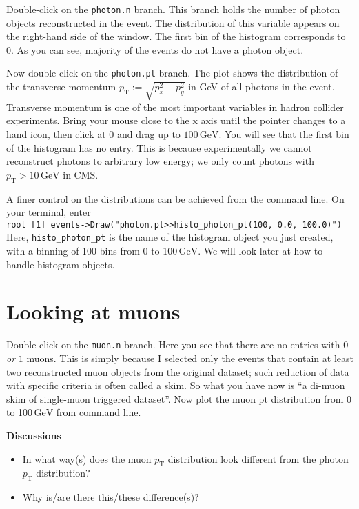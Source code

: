 \documentclass[12pt]{article}
\newcommand{\rterminal}[2]{\vspace{3pt}\texttt{root [#1] #2} \\}
\newcommand{\GeV}{\ensuremath{\,\mathrm{GeV}}\xspace}
\newcommand{\pt}{\ensuremath{p_{\mathrm{T}}}\xspace}
\newenvironment{discussions}{%
\vspace{0.2in}%
\textbf{Discussions}%
\begin{itemize}%
}{%
\end{itemize}%
}
\begin{document}
Double-click on the \texttt{photon.n} branch. This branch holds the number of photon objects reconstructed in the event. The distribution of this variable appears on the right-hand side of the window. The first bin of the histogram corresponds to $0$. As you can see, majority of the events do not have a photon object.

Now double-click on the \texttt{photon.pt} branch. The plot shows the distribution of the transverse momentum $\pt := \sqrt{p_{x}^2 + p_{y}^2}$ in GeV of all photons in the event. Transverse momentum is one of the most important variables in hadron collider experiments. Bring your mouse close to the x axis until the pointer changes to a hand icon, then click at $0$ and drag up to $100\GeV$. You will see that the first bin of the histogram has no entry. This is because experimentally we cannot reconstruct photons to arbitrary low energy; we only count photons with $\pt > 10\GeV$ in CMS.

A finer control on the distributions can be achieved from the command line. On your terminal, enter \\
\rterminal{1}{events->Draw("photon.pt>>histo\_photon\_pt(100, 0.0, 100.0)")}
Here, \texttt{histo\_photon\_pt} is the name of the histogram object you just created, with a binning of 100 bins from 0 to 100\GeV. We will look later at how to handle histogram objects.

\section{Looking at muons}
Double-click on the \texttt{muon.n} branch. Here you see that there are no entries with $0$ \textit{or} $1$ muons. This is simply because I selected only the events that contain at least two reconstructed muon objects from the original dataset; such reduction of data with specific criteria is often called a skim. So what you have now is ``a di-muon skim of single-muon triggered dataset''. Now plot the muon pt distribution from 0 to 100\GeV from command line.

\begin{discussions}
\item In what way(s) does the muon \pt distribution look different from the photon \pt distribution?
\item Why is/are there this/these difference(s)?
\end{discussions}
\end{document}
